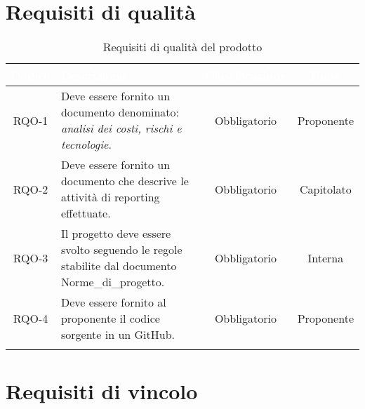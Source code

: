 \section{Requisiti di qualità}

\begingroup
\setlength{\tabcolsep}{10pt}
\renewcommand{\arraystretch}{1.5}
\begin{xltabular}{\textwidth}{| c | X | c | c |}
    \hline
     \textbf{\textcolor{white}{Codice}} & \textbf{\textcolor{white}{Descrizione}} & \textbf{\textcolor{white}{Classificazione}} & \textbf{\textcolor{white}{Fonte}}\\
    \hline
    \endhead
    RQO-1 & Deve essere fornito un documento denominato:\textit{ analisi dei costi, rischi e tecnologie}. & Obbligatorio & Proponente \\
    \hline
    RQO-2 & Deve essere fornito un documento che descrive le attività di  reporting effettuate. & Obbligatorio & Capitolato \\
    \hline
    RQO-3 & Il progetto deve essere svolto seguendo le regole stabilite dal documento Norme\_di\_progetto. & Obbligatorio & Interna \\
    \hline
    RQO-4 & Deve essere fornito al proponente il codice sorgente in un  GitHub. & Obbligatorio & Proponente \\
    \hline
     \caption{Requisiti di qualità del prodotto}
    \label{tab:reqqua}
\end{xltabular}
\endgroup
\newpage
\section{Requisiti di vincolo}

